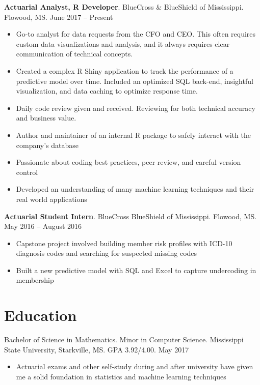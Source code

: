 \documentclass[11pt, a4paper]{awesome-cv}
\providecommand{\tightlist}{%
	\setlength{\itemsep}{0pt}\setlength{\parskip}{0pt}}
\begin{document}
\textbf{Actuarial Analyst, R Developer}. BlueCross \& BlueShield of Mississippi. Flowood, MS. June 2017 -- Present

\begin{itemize}
\item
  Go-to analyst for data requests from the CFO and CEO. This often requires custom data visualizations and analysis, and it always requires clear communication of technical concepts.
\item
  Created a complex R Shiny application to track the performance of a predictive model over time. Included an optimized SQL back-end, insightful visualization, and data caching to optimize response time.
\item
  Daily code review given and received. Reviewing for both technical accuracy and business value.
\item
  Author and maintainer of an internal R package to safely interact with the company's database
\item
  Passionate about coding best practices, peer review, and careful version control
\item
  Developed an understanding of many machine learning techniques and their real world applications
\end{itemize}

\textbf{Actuarial Student Intern}. BlueCross BlueShield of Mississippi. Flowood, MS. May 2016 -- August 2016

\begin{itemize}
\item
  Capstone project involved building member risk profiles with ICD-10 diagnosis codes and searching for suspected missing codes
\item
  Built a new predictive model with SQL and Excel to capture undercoding in membership
\end{itemize}

\hypertarget{education}{%
\section{Education}\label{education}}

Bachelor of Science in Mathematics. Minor in Computer Science. Mississippi State University, Starkville, MS. GPA 3.92/4.00. May 2017

\begin{itemize}
\tightlist
\item
  Actuarial exams and other self-study during and after university have given me a solid foundation in statistics and machine learning techniques
\end{itemize}
\end{document}
